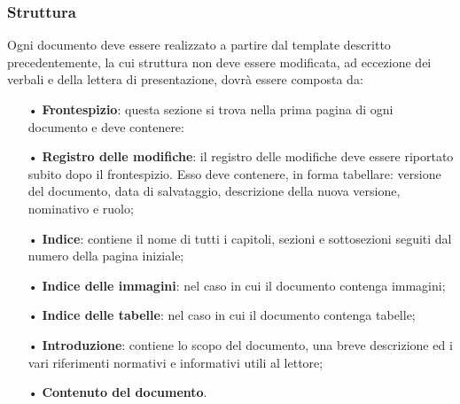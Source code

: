 \subsubsection{Struttura}
Ogni documento deve essere realizzato a partire dal template descritto precedentemente, la cui struttura non deve essere modificata, ad eccezione dei verbali e della lettera di presentazione, dovrà essere composta da:
\begin{itemize}
\item[•] \textbf{Frontespizio}: questa sezione si trova nella prima pagina di ogni documento e deve contenere:
\item[•] \textbf{Registro delle modifiche}: il registro delle modifiche deve essere riportato subito dopo il frontespizio. Esso deve contenere, in forma tabellare: versione del documento, data di salvataggio, descrizione della nuova versione, nominativo e ruolo;
\item[•] \textbf{Indice}: contiene il nome di tutti i capitoli, sezioni e sottosezioni seguiti dal numero della pagina iniziale;
\item[•] \textbf{Indice delle immagini}: nel caso in cui il documento contenga immagini;
\item[•] \textbf{Indice delle tabelle}: nel caso in cui il documento contenga tabelle;
\item[•] \textbf{Introduzione}: contiene lo scopo del documento, una breve descrizione ed i vari riferimenti normativi e informativi utili al lettore;
\item[•] \textbf{Contenuto del documento}.
\end{itemize}



